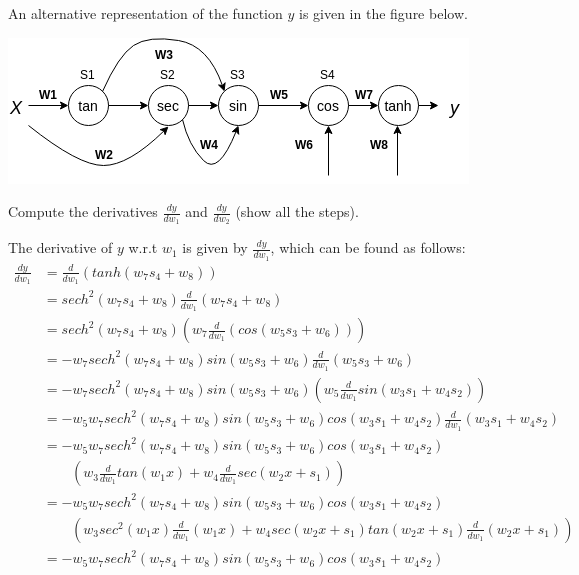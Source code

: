 \documentclass[solution,addpoints,12pt]{exam}
\begin{document}
\begin{questions}
          An alternative representation of the function $y$ is given in the figure below.
          \begin{center}
            \includegraphics[scale=0.7]{fig2.png}
          \end{center}

          Compute the derivatives $\frac{dy}{dw_1}$ and $\frac{dy}{dw_2}$ (show all the steps).

          \begin{solution}
          \vspace*{0mm}
          The derivative of $y$ w.r.t $w_1$ is given by $\frac{dy}{dw_1}$,  which can be found as follows:
          \begin{align*}
            \frac{dy}{dw_1} &= \frac{d}{dw_1}(tanh(w_7 s_4 + w_8))\\
            &= sech^2(w_7 s_4 + w_8)\frac{d}{dw_1}(w_7 s_4 + w_8)\\
            &= sech^2(w_7 s_4 + w_8)(w_7\frac{d}{dw_1}(cos(w_5 s_3 + w_6)))\\
            &= -w_7 sech^2(w_7 s_4 + w_8)sin(w_5 s_3 + w_6) \frac{d}{dw_1}(w_5 s_3 + w_6)\\
            &= -w_7 sech^2(w_7 s_4 + w_8)sin(w_5 s_3 + w_6) (w_5 \frac{d}{dw_1}sin(w_3 s_1 + w_4 s_2))\\
            &= -w_5 w_7 sech^2(w_7 s_4 + w_8)sin(w_5 s_3 + w_6) cos(w_3 s_1 + w_4 s_2)\frac{d}{dw_1}(w_3 s_1 + w_4 s_2)\\
            &= -w_5 w_7 sech^2(w_7 s_4 + w_8)sin(w_5 s_3 + w_6) cos(w_3 s_1 + w_4 s_2)\\
            & \qquad(w_3 \frac{d}{dw_1}tan(w_1 x) + w_4 \frac{d}{dw_1}sec(w_2 x + s_1))\\
            &= -w_5 w_7 sech^2(w_7 s_4 + w_8)sin(w_5 s_3 + w_6) cos(w_3 s_1 + w_4 s_2)\\
            & \qquad(w_3 sec^2(w_1 x)\frac{d}{dw_1}(w_1 x) + w_4 sec(w_2 x + s_1)tan(w_2 x + s_1)\frac{d}{dw_1}(w_2 x + s_1))\\
            &= -w_5 w_7 sech^2(w_7 s_4 + w_8)sin(w_5 s_3 + w_6) cos(w_3 s_1 + w_4 s_2)\\

\end{align*}
\end{solution}
\end{questions}
\end{document}
